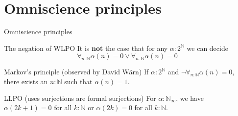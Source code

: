 \documentclass{beamer}
\begin{document}
\section{Omniscience principles}
\begin{frame}{Omniscience principles} 
  \begin{block}{The negation of WLPO}
    It is \textbf{not} the case that for any $\alpha:2^\mathbb N$ we can decide 
    $$
    \forall_{n:\mathbb N} \alpha(n)  = 0 
    \vee
    \forall_{n:\mathbb N} \alpha(n)  = 0 
    $$
  \end{block}
  \pause
  \begin{block}{Markov's principle (observed by David W\"arn) }
    If $\alpha: 2^\mathbb N$ and $\neg 
    \forall_{n:\mathbb N} \alpha(n)  = 0 $, 
    there exists an $n:\mathbb N$ such that $\alpha(n) = 1$. 
  \end{block}
  \pause
  \begin{block}{LLPO (uses surjections are formal surjections)}
    For $\alpha:\mathbb N_\infty$, we have 
    $\alpha(2k+1) = 0 $ for all $k:\mathbb N$ or 
    $\alpha(2k) = 0$ for all $k:\mathbb N$.
  \end{block}
\end{frame}
\end{document}
